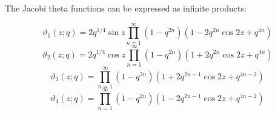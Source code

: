 \documentclass[12pt]{article}
\begin{document}
The Jacobi theta functions can be expressed as infinite products:

$$\vartheta_1 (z;q) = 2 q^{1/4} \sin z \prod_{n=1}^\infty (1 - q^{2n}) (1 - 2 q^{2n} \cos 2 z + q^{4n})$$
$$\vartheta_2 (z;q) = 2 q^{1/4} \cos z \prod_{n=1}^\infty (1 - q^{2n}) (1 + 2 q^{2n} \cos 2 z + q^{4n})$$
$$\vartheta_3 (z;q) = \prod_{n=1}^\infty (1 - q^{2n}) (1 + 2 q^{2n-1} \cos 2 z + q^{4n-2})$$
$$\vartheta_4 (z;q) = \prod_{n=1}^\infty (1 - q^{2n}) (1 - 2 q^{2n-1} \cos 2 z + q^{4n-2})$$
\end{document}
